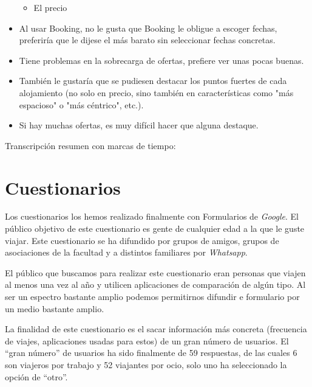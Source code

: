 \begin{itemize}
\begin{itemize}
        \item El precio
    \end{itemize}
    \item Al usar Booking, no le gusta que Booking le obligue a escoger fechas, preferiría que le dijese el más barato sin seleccionar fechas concretas.
    \item Tiene problemas en la sobrecarga de ofertas, prefiere ver unas pocas buenas.
    \item También le gustaría que se pudiesen destacar los puntos fuertes de cada alojamiento (no solo en precio, sino también en características como "más espacioso" o "más céntrico", etc.).
    \item Si hay muchas ofertas, es muy difícil hacer que alguna destaque.
\end{itemize}


Transcripción resumen con marcas de tiempo:

\section{Cuestionarios}

Los cuestionarios los hemos realizado finalmente con Formularios de \textit{Google}. El público objetivo de este cuestionario es gente de cualquier edad a la que le guste viajar. Este cuestionario se ha difundido por grupos de amigos, grupos de asociaciones de la facultad y a distintos familiares por \textit{Whatsapp}.

El público que buscamos para realizar este cuestionario eran personas que viajen al menos una vez al año y utilicen aplicaciones de comparación de algún tipo. Al ser un espectro bastante amplio podemos permitirnos difundir e formulario por un medio bastante amplio.

La finalidad de este cuestionario es el sacar información más concreta (frecuencia de viajes, aplicaciones usadas para estos) de un gran número de usuarios. El ``gran número'' de usuarios ha sido finalmente de 59 respuestas, de las cuales 6 son viajeros por trabajo y 52 viajantes por ocio, solo uno ha seleccionado la opción de ``otro''.

